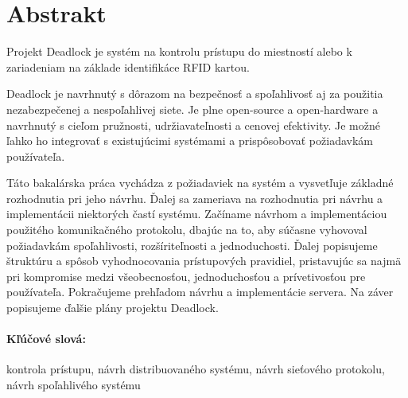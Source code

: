 
\newpage
\section*{Abstrakt}

Projekt Deadlock je systém na kontrolu prístupu do miestností alebo k zariadeniam na základe identifikáce RFID kartou.

Deadlock je navrhnutý s dôrazom na bezpečnosť a spoľahlivosť aj za použitia nezabezpečenej
a nespoľahlivej siete. Je plne open-source a open-hardware a navrhnutý s cieľom pružnosti,
udržiavateľnosti a cenovej efektivity. Je možné ľahko ho integrovať s existujúcimi systémami
a prispôsobovať požiadavkám používateľa.

Táto bakalárska práca vychádza z požiadaviek na systém a vysvetľuje základné
rozhodnutia pri jeho návrhu. Ďalej sa zameriava na rozhodnutia pri návrhu a implementácii
niektorých častí systému. Začíname návrhom a implementáciou použitého komunikačného protokolu,
dbajúc na to, aby súčasne vyhovoval
požiadavkám spoľahlivosti, rozšíriteľnosti a jednoduchosti. Ďalej popisujeme štruktúru
a spôsob vyhodnocovania prístupových pravidiel, pristavujúc sa najmä pri kompromise medzi všeobecnosťou,
jednoduchosťou a prívetivosťou pre používateľa. Pokračujeme prehľadom návrhu a implementácie servera.
Na záver popisujeme ďalšie plány projektu Deadlock.

\paragraph*{Kľúčové slová:} kontrola prístupu, návrh distribuovaného systému, návrh sieťového protokolu, návrh spoľahlivého systému


%
%



\newpage

\tableofcontents


